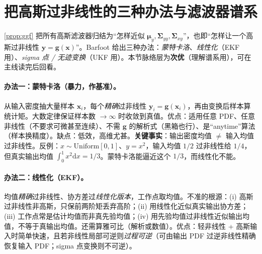 \section{把高斯过非线性的三种办法与滤波器谱系}
\label{sec:nonlin-pdf}

\cref{prop:ggf} 把所有高斯滤波器归结为“怎样近似 $\boldsymbol{\mu}_y,\boldsymbol{\Sigma}_{yy},\boldsymbol{\Sigma}_{xy}$”，也即“怎样让一个高斯过非线性 $\mathbf{y}=\mathbf{g}(\mathbf{x})$”。Barfoot\cite{barfoot2024state} 给出三种办法：\emph{蒙特卡洛}、\emph{线性化}（EKF 用）、\emph{sigma 点 / 无迹变换}（UKF 用）。本节脉络层为\textbf{次优}（理解谱系用），可在主线读完后回看。

\paragraph{办法一：蒙特卡洛（暴力，作基准）。}
从输入密度抽大量样本 $\mathbf{x}_i$，每个\emph{精确}过非线性 $\mathbf{y}_i=\mathbf{g}(\mathbf{x}_i)$，再由变换后样本算统计矩。大数定律保证样本数 $\to\infty$ 时收敛到真值。优点：适用任意 PDF、任意非线性（不要求可微甚至连续）、不需 $\mathbf{g}$ 的解析式（黑箱也行）、是“anytime”算法（样本换精度）。缺点：低效，高维尤甚。\textbf{关键事实}：输出密度均值 $\ne$ 输入均值过非线性。反例：$x\sim\mathrm{Uniform}[0,1]$、$y=x^2$，输入均值 $1/2$ 过非线性给 $1/4$，但真实输出均值 $\int_0^1 x^2\mathrm{d}x=1/3$。蒙特卡洛能逼近这个 $1/3$，而线性化不能。

\paragraph{办法二：线性化（EKF）。}
均值\emph{精确}过非线性、协方差过\emph{线性化版本}，工作点取均值。不准的根源：(i) 高斯过非线性非高斯，只保前两阶矩丢弃高阶；(ii) 用线性化近似真实输出协方差；(iii) 工作点常是估计均值而非真先验均值；(iv) 用先验均值过非线性近似输出均值，不等于真输出均值。还需算雅可比（解析或数值）。优点：轻非线性 + 高斯输入时简单快速，且若非线性局部可逆则\emph{过程可逆}（可由输出 PDF 过逆非线性精确恢复输入 PDF；sigma 点变换则不可逆）。

